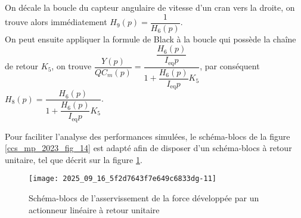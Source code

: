 \ifprof
\begin{corrige}

On décale la boucle du capteur angulaire de vitesse d'un cran vers la droite, on trouve alors immédiatement $\boxed{H_9(p) = \dfrac{1}{H_6(p)}}$.\\

On peut ensuite appliquer la formule de Black à la boucle qui possède la chaîne de retour $K_5$, on trouve $\dfrac{Y(p)}{Q C_m(p)} = \dfrac{\dfrac{H_6(p)}{I_{\text{eq}}p}}{1+ \dfrac{H_6(p)}{I_{\text{eq}}p}K_5}$, par conséquent $\boxed{H_8(p) = \dfrac{H_6(p)}{1+ \dfrac{H_6(p)}{I_{\text{eq}}p}K_5}}$.

\end{corrige}
\else
\fi

\ifprof
\else

Pour faciliter l'analyse des performances simulées, le schéma-blocs de la figure \ref{ccs_mp_2023_fig_14} est adapté afin de disposer d'un schéma-blocs à retour unitaire, tel que décrit sur la figure \ref{ccs_mp_2023_fig_15}.



\begin{figure}[!h]
\centering
\texttt{[image: 2025\_09\_16\_5f2d7643f7e649c6833dg-11]}
\caption{\label{ccs_mp_2023_fig_15} Schéma-blocs de l'asservissement de la force développée par un actionneur linéaire à retour unitaire}
\end{figure}
\fi

